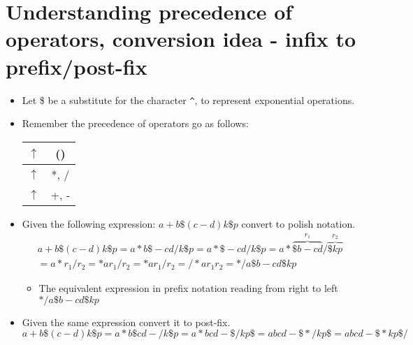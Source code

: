 \section{Understanding precedence of operators, conversion idea - infix to prefix/post-fix}
\begin{itemize}
    \item Let \$ be a substitute for the character \verb|^|, to represent exponential operations. 
    \item Remember the precedence of operators go as follows:
        \begin{center}
            \begin{tabular}{ |c|c| }
                \hline
                $\uparrow$  & () \\
                \hline
                $\uparrow$  & *, / \\
                \hline
                $\uparrow$  & +, - \\
                \hline
            \end{tabular}
        \end{center}

    
    \item Given the following expression: $a+b\$(c-d)k\$p$ convert to polish notation. 
        \begin{multline*}
            a+b\$(c-d)k\$p = a*b\$-cd/k\$p = a*\$-cd/k\$p = a*\overbrace{\$b-cd}^{r_1}/\overbrace{\$kp}^{r_2} \\ 
            = a*r_1/r_2 = *ar_1/r_2 = *ar_1/r_2 = /*ar_1r_2 = */a\$b-cd\$kp
        \end{multline*}
        \begin{itemize}
            \item The equivalent expression in prefix notation reading from right to left $*/a\$b-cd\$kp$
        \end{itemize}
    
    \item Given the same expression convert it to post-fix.
        \[
            a+b\$(c-d)k\$p = a*b\$cd-/k\$p = a*bcd-\$/kp\$ = abcd-\$*/kp\$ = abcd-\$*kp\$/
        \]
\end{itemize}


